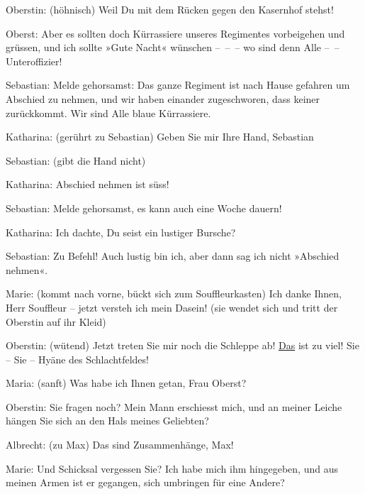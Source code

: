 \pstart
           Oberstin: (höhnisch) Weil Du mit dem Rücken gegen den Kasernhof stehst!\pend
           
\pstart
           Oberst: Aber es sollten doch Kürrassiere unseres Regimentes vorbeigehen und grüssen,
               und ich sollte »Gute Nacht« wünschen – – – wo sind denn Alle – – Unteroffizier!\pend
           
\pstart
           Sebastian: Melde gehorsamst: Das ganze Regiment ist nach Hause gefahren um Abschied
               zu nehmen, und wir haben einander {\pb}zugeschworen, dass keiner zurückkommt. Wir sind Alle blaue Kürrassiere.\pend
           
\pstart
           Katharina: (gerührt zu Sebastian) Geben Sie mir Ihre Hand, Sebastian\pend
           
\pstart
           Sebastian: (gibt die Hand nicht)\pend
           
\pstart
           Katharina: Abschied nehmen ist süss!\pend
           
\pstart
           Sebastian: Melde gehorsamst, es kann auch eine Woche dauern!\pend
           
\pstart
           Katharina: Ich dachte, Du seist ein lustiger Bursche?\pend
           
\pstart
           Sebastian: Zu Befehl! Auch lustig bin ich, aber dann sag ich nicht »Abschied
               nehmen«.\pend
           
\pstart
           Marie: (kommt nach vorne, bückt sich zum Souffleurkasten) Ich danke Ihnen, Herr
               Souffleur – jetzt versteh ich mein Dasein! (sie wendet sich und tritt der Oberstin
               auf ihr Kleid)\pend
           
\pstart
           Oberstin: (wütend) Jetzt treten Sie mir noch die Schleppe ab! \uline{Das} ist zu viel! Sie – Sie – Hyäne des Schlachtfeldes!\pend
           
\pstart
           Maria: (sanft) Was habe ich Ihnen getan, Frau Oberst?\pend
           
\pstart
           Oberstin: Sie fragen noch? Mein Mann erschiesst mich, und an meiner Leiche hängen Sie
               sich an den Hals meines Geliebten?\pend
           
\pstart
           Albrecht: (zu Max) Das sind  Zusammenhänge, Max!\pend
           
\pstart
           Marie: Und  Schicksal vergessen Sie? Ich habe mich ihm
               hingegeben, und aus meinen Armen ist er gegangen, sich umbringen für eine Andere?
                  \label{K_L01900-2v}\label{K_L01900-2}\pend
           
